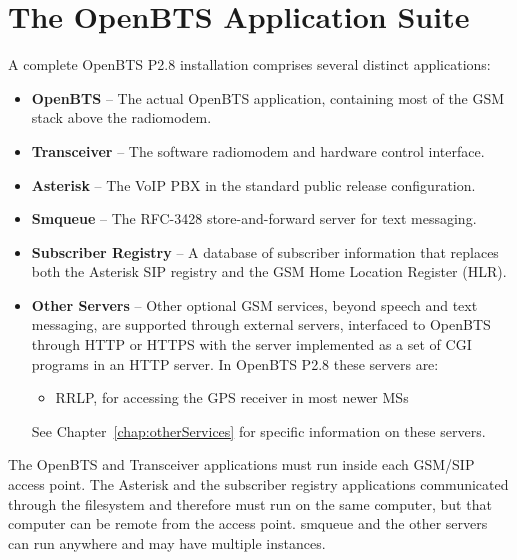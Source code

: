 \documentclass[11pt,openany]{book}
\begin{document}
\chapter{The OpenBTS Application Suite}
A complete OpenBTS P2.8 installation comprises several distinct applications:
\begin{itemize}
	\item {\bf OpenBTS} -- The actual OpenBTS application, containing most of the GSM stack above the radiomodem.
	\item {\bf Transceiver} -- The software radiomodem and hardware control interface.
	\item {\bf Asterisk} -- The VoIP PBX in the standard public release configuration.
	\item {\bf Smqueue} -- The RFC-3428 store-and-forward server for text messaging.
	\item {\bf Subscriber Registry} -- A database of subscriber information that replaces both the Asterisk SIP registry and the GSM Home Location Register (HLR).
	\item {\bf Other Servers} -- Other optional GSM services, beyond speech and text messaging, are supported through external servers, interfaced to OpenBTS through HTTP or HTTPS with the server implemented as a set of CGI programs in an HTTP server.   In OpenBTS P2.8 these servers are:
	\begin{itemize}
		\item RRLP, for accessing the GPS receiver in most newer MSs
	\end{itemize}
	See Chapter~\ref{chap:otherServices} for specific information on these servers.
\end{itemize}
The OpenBTS and Transceiver applications must run inside each GSM/SIP access point.  The Asterisk and the subscriber registry applications communicated through the filesystem and therefore must run on the same computer, but that computer can be remote from the access point.  smqueue and the other servers can run anywhere and may have multiple instances.  
\end{document}

